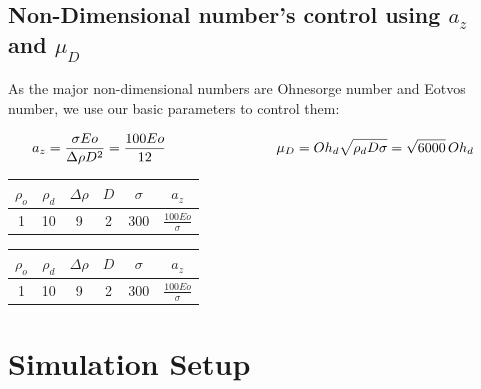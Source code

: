 \documentclass[12pt]{article}
\begin{document}
\subsection{Non-Dimensional number's control using $a_z$ and $\mu_D$}


As the major non-dimensional numbers are Ohnesorge number and Eotvos number, we use our basic parameters to control them:



\begin{align}
    a_z  &= \frac{\sigma Eo}{\Delta \rho D^2} = \frac{100Eo}{12} 
    \hspace{0.2\textwidth} 
    & \mu_D &= Oh_d \sqrt{\rho_d D \sigma} = \sqrt{6000} \, Oh_d
\end{align}

\begin{minipage}[t]{0.45\textwidth}
    \centering
    \begin{tabular}{|c|c|c|c|c|c|}
        \hline
        $\rho_o$ & $\rho_d$ & $\Delta \rho$ & $D$ & $\sigma$ & $a_z$  \\ \hline
        1 & 10 & 9 & 2 & 300 &  $\frac{100 Eo}{\sigma}$ \\ \hline
    \end{tabular}
\end{minipage}
\hfill
\begin{minipage}[t]{0.45\textwidth}
    \centering
    \begin{tabular}{|c|c|c|c|c|c|}
        \hline
        $\rho_o$ & $\rho_d$ & $\Delta \rho$ & $D$ & $\sigma$ & $a_z$  \\ \hline
        1 & 10 & 9 & 2 & 300 &  $\frac{100 Eo}{\sigma}$ \\ \hline
    \end{tabular}
\end{minipage}





\section{Simulation Setup}
\end{document}
